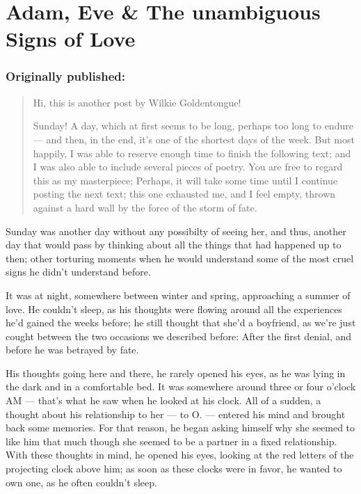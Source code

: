 \chapter{Adam, Eve \& The unambiguous Signs of Love}
\label{cha:adam-eve-unambiguous-signs-love}
\subsection*{Originally published: }
\begin{quote}
  Hi, this is another post by Wilkie Goldentongue!

  Sunday! A day, which at first seems to be long, perhaps too long to endure --- and then, in the end, it's one of the shortest days of the week. 
  But most happily, I was able to reserve enough time to finish the following text; and I was also able to include several pieces of poetry. 
  You are free to regard this as my masterpiece; Perhaps, it will take some time until I continue posting the next text; this one exhausted me, and I feel empty, thrown against a hard wall by the force of the storm of fate.
\end{quote}

Sunday was another day without any possibilty of seeing her, and thus, another day that would pass by thinking about all the things that had happened up to then; other torturing moments when he would understand some of the most cruel signs he didn't understand before.

It was at night, somewhere between winter and spring, approaching a summer of love. He couldn't sleep, as his thoughts were flowing around all the experiences he'd gained the weeks before; he still thought that she'd a boyfriend, as we're just cought between the two occasions we described before: After the first denial, and before he was betrayed by fate.

His thoughts going here and there, he rarely opened his eyes, as he was lying in the dark and in a comfortable bed. It was somewhere around three or four o'clock AM --- that's what he saw when he looked at his clock. All of a sudden, a thought about his relationship to her --- to O. --- entered his mind and brought back some memories. For that reason, he began asking himself why she seemed to like him that much though she seemed to be a partner in a fixed relationship. With these thoughts in mind, he opened his eyes, looking at the red letters of the projecting clock above him; as soon as these clocks were in favor, he wanted to own one, as he often couldn't sleep.

